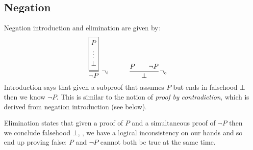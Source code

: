 \begin{remark}
  \end{remark}

\subsection{Negation}
\label{sec:negation}

Negation introduction and elimination are given by:
%
\begin{align*}
\setlength{\arraycolsep}{0em}
\dfrac{
\fbox{$\begin{array}{c} P \\ \vdots \\ \bot\end{array}$}}
      {\neg P} \; {\neg_i}
\qquad\quad
\dfrac{P \qquad \neg P}{\bot} {\neg_e}
\end{align*}
%
Introduction says that given a subproof that assumes $P$ but ends in
falsehood $\bot$ then we know $\neg P$. This is similar to the notion of
\emph{proof by contradiction}, which is derived from negation introduction (see below).

Elimination states that given a proof of $P$ and a simultaneous proof of
$\neg P$ then we conclude falsehood $\bot$, \ie{}, we have a
logical inconsistency on our hands and so end up proving false:
$P$ and $\neg P$ cannot both be true at the same time.

